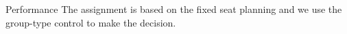 

  \begin{frame}{Performance}
    \scriptsize
    The assignment is based on the fixed seat planning and we use the group-type control to make the decision. 


\end{frame}
